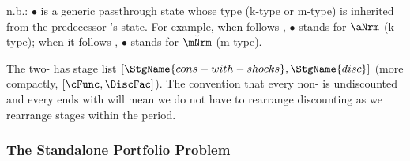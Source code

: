 \begin{table}[h]\caption{Discounting {\Stg} ($\DiscFac$) {\Prchs}}\label{tab:prchs-disc}
\newsavebox{\disctablebox}%
\begin{center}
    \usebox{\disctablebox}

    \parbox{\wd\disctablebox}{\footnotesize n.b.: $\bullet$ is a generic passthrough state whose type (k-type or m-type) is inherited from the predecessor {\stg}'s {\Continuation} state.  For example, when  follows , $\bullet$ stands for $\aNrm$ (k-type); when it follows , $\bullet$ stands for $\check{\mNrm}$ (m-type).}
  \end{center}
  \end{table}


  The two-{\stg} {\interval} has stage list $[\StgName{cons-with-shocks}, \StgName{disc}]$ (more compactly, $[\cFunc, \DiscFac]$).  The convention that every non- {\stg} is undiscounted and every {\interval} ends with  will mean we do not have to rearrange discounting as we rearrange stages within the period.

\hypertarget{standalone-portfolio-problem}{}
\subsubsection{The Standalone Portfolio Problem}\label{subsec:MCTheory}

